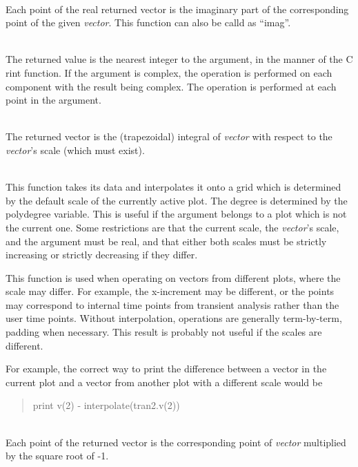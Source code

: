\begin{description}
\item{}\\
Each point of the real returned vector is the imaginary part of the
corresponding point of the given {\it vector\/}.  This function can
also be calld as ``{\vt imag}''.

\item{}\\
The returned value is the nearest integer to the argument, in the
manner of the C {\vt rint} function.  If the argument is complex, the
operation is performed on each component with the result being
complex.  The operation is performed at each point in the argument.

\item{}\\
The returned vector is the (trapezoidal) integral of {\it vector}
with respect to the {\it vector\/}'s scale (which must exist).

\item{}\\
This function takes its data and interpolates it onto a grid which is
determined by the default scale of the currently active plot.  The
degree is determined by the {\et polydegree} variable.  This is useful
if the argument belongs to a plot which is not the current one.  Some
restrictions are that the current scale, the {\it vector\/}'s scale,
and the argument must be real, and that either both scales must be
strictly increasing or strictly decreasing if they differ.

This function is used when operating on vectors from different plots,
where the scale may differ.  For example, the x-increment may be
different, or the points may correspond to internal time points from
transient analysis rather than the user time points.  Without
interpolation, operations are generally term-by-term, padding when
necessary.  This result is probably not useful if the scales are
different.

For example, the correct way to print the difference between a vector
in the current plot and a vector from another plot with a different
scale would be
\begin{quote}
{\vt print v(2) - interpolate(tran2.v(2))}
\end{quote}

\item{}\\
Each point of the returned vector is the corresponding point of
{\it vector} multiplied by the square root of -1.


\end{description}
